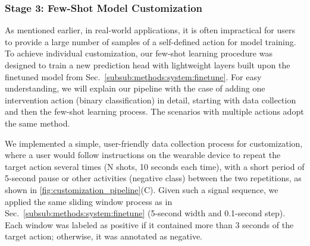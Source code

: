 \subsubsection{Stage 3: Few-Shot Model Customization}  
\label{subsub:methods:system:fewshot}

As mentioned earlier, in real-world applications, it is often impractical for users to provide a large number of samples of a self-defined action for model training.
To achieve individual customization, our few-shot learning procedure was designed to train a new prediction head with lightweight layers built upon the finetuned model from Sec.~\ref{subsub:methods:system:finetune}.
For easy understanding, we will explain our pipeline with the case of adding one intervention action (\ie binary classification) in detail, starting with data collection and then the few-shot learning process. The scenarios with multiple actions adopt the same method.

We implemented a simple, user-friendly data collection process for customization, where a user would follow instructions on the wearable device to repeat the target action several times (N shots, 10 seconds each time), with a short period of 5-second pause or other activities (negative class) between the two repetitions, as shown in \autoref{fig:customization_pipeline}(C).
Given such a signal sequence, we applied the same sliding window process as in Sec.~\ref{subsub:methods:system:finetune} (5-second width and 0.1-second step).
Each window was labeled as positive if it contained more than 3 seconds of the target action; otherwise, it was annotated as negative.

